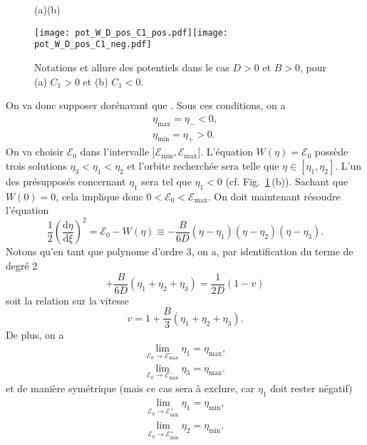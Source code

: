 \documentclass[10pt,a4paper, oneside, fleqn]{myarticle}
\newcommand{\dd}{\mathrm{d}}
\newcommand{\Ecal}{\mathcal{E}}
\begin{document}
\begin{figure}[ht!]
  \centering
  \quad(a)\hspace*{6cm}(b)
  
  \texttt{[image: pot\_W\_D\_pos\_C1\_pos.pdf]}\texttt{[image: pot\_W\_D\_pos\_C1\_neg.pdf]}
  \caption{Notations et allure des potentiels dans le cas $D>0$ et $B>0$, pour (a) $C_1>0$ et (b) $C_1<0$.}\label{fig_pot_W}
\end{figure}

On va donc supposer dorénavant que . Sous ces conditions, on a 
\begin{gather}
  \eta_{\max} = \eta_- <0,\\
  \eta_{\min} = \eta_+ > 0.
\end{gather}
On va choisir $\Ecal_0$ dans l'intervalle $]\Ecal_{\min}, \Ecal_{\max}[$. L'équation $W(\eta) = \Ecal_0$ possède trois solutions $\eta_3<\eta_1<\eta_2$ et l'orbite recherchée sera telle que $\eta\in[\eta_1, \eta_2]$. L'un des présupposés concernant $\eta_1$ sera tel que $\eta_1<0$ (cf. Fig.~\ref{fig_pot_W}\,(b)). Sachant que $W(0)=0$, cela implique donc $0<\Ecal_0<\Ecal_{\max}$. On doit maintenant résoudre l'équation
\begin{equation}
  \frac 1 2 \left( \frac{\dd \eta}{\dd \xi} \right)^2 = \Ecal_0-W(\eta) \equiv -\frac{B}{6D} (\eta - \eta_1) (\eta - \eta_2) (\eta - \eta_3). \label{eq_energie}
\end{equation}
Notons qu'en tant que polynome d'ordre 3, on a, par identification du terme de degré 2
\begin{equation}
  +\frac{B}{6D}(\eta_1 + \eta_2 + \eta_3) = \frac{1}{2D}(1-v) 
\end{equation}
soit la relation sur la vitesse
\begin{equation}
  v = 1+\frac{B}{3}(\eta_1 + \eta_2 + \eta_3). \label{vitesse_v}
\end{equation}
De plus, on a 
\begin{align}
 \lim_{\Ecal_0 \to \Ecal_{\max}^-}\eta_1= \eta_{\max},\\
 \lim_{\Ecal_0 \to \Ecal_{\max}^-}\eta_3= \eta_{\max}.
\end{align}
et de manière symétrique (mais ce cas sera à exclure, car $\eta_1$ doit rester négatif)
\begin{align}
 \lim_{\Ecal_0 \to \Ecal_{\min}^+}\eta_1= \eta_{\min},\\
 \lim_{\Ecal_0 \to \Ecal_{\min}^+}\eta_2= \eta_{\min}.
\end{align}
\end{document}
